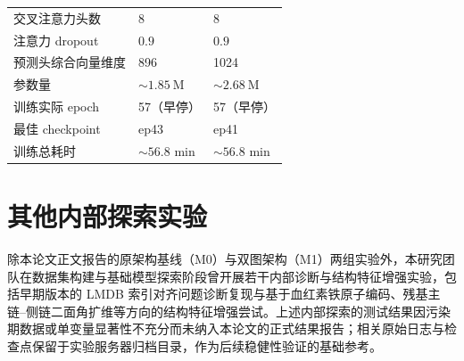 \begin{table}[htbp]
\begin{tabular}{lll}
    交叉注意力头数      & 8                    & 8 \\
    注意力 dropout      & $0.9$                & $0.9$ \\
    预测头综合向量维度  & 896                  & 1024 \\
    参数量              & $\sim 1.85~\mathrm{M}$ & $\sim 2.68~\mathrm{M}$ \\
    \midrule
    训练实际 epoch      & 57（早停）           & 57（早停）\\
    最佳 checkpoint     & ep43                 & ep41 \\
    训练总耗时          & $\sim 56.8$ min      & $\sim 56.8$ min \\
    \bottomrule
  \end{tabular}
\end{table}

\section{其他内部探索实验}
\label{app:other-experiments}

除本论文正文报告的原架构基线（M0）与双图架构（M1）两组实验外，本研究团队在数据集构建与基础模型探索阶段曾开展若干内部诊断与结构特征增强实验，包括早期版本的 LMDB 索引对齐问题诊断复现与基于血红素铁原子编码、残基主链--侧链二面角扩维等方向的结构特征增强尝试。上述内部探索的测试结果因污染期数据或单变量显著性不充分而未纳入本论文的正式结果报告；相关原始日志与检查点保留于实验服务器归档目录，作为后续稳健性验证的基础参考。
